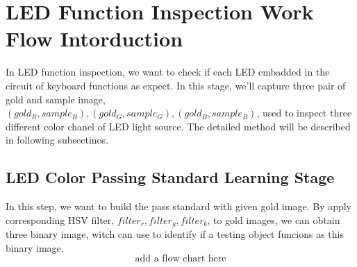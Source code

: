 \section{LED Function Inspection Work Flow Intorduction}
	In LED function inspection, we want to check if each LED embadded in the circuit of keyboard functions as expect.
	In this stage, we'll capture three pair of gold and sample image, $(gold_R, sample_R), (gold_G, sample_G), (gold_B, sample_B)$, used to inspect three different color chanel of LED light source.
	The detailed method will be described in following subsectinos.
	\subsection{LED Color Passing Standard Learning Stage}
		In this step, we want to build the pass standard with given gold image.
		By apply corresponding HSV filter, $filter_r, filter_g, filter_b$, to gold images, we can obtain three binary image, witch can use to identify if a testing object funcions as this binary image.
		$$ \textrm{add a flow chart here} $$

